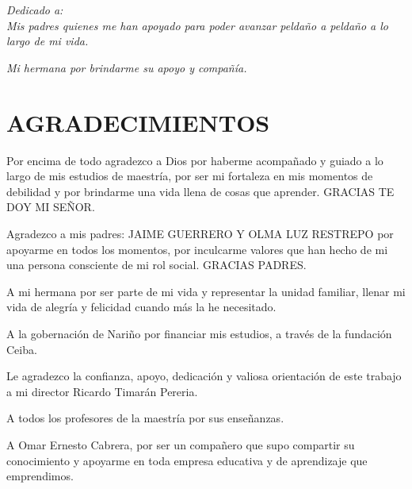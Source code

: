 
\chapter*{}
\begin{flushright}
\textit{Dedicado a: \\
Mis padres quienes me han apoyado  para poder avanzar peldaño a peldaño a lo largo de mi vida.}

\textit{Mi hermana por brindarme su apoyo y compañía.}


\end{flushright}


\chapter*{AGRADECIMIENTOS} %

Por encima de todo agradezco a Dios por haberme acompañado y guiado a lo largo de mis estudios de maestría, por ser mi fortaleza en mis momentos de debilidad y por brindarme una vida llena de cosas que aprender. GRACIAS TE DOY MI SEÑOR.

Agradezco a mis padres: JAIME GUERRERO Y OLMA LUZ RESTREPO por apoyarme en todos los momentos, por inculcarme valores que han hecho de mi una persona consciente de mi rol social. GRACIAS PADRES.

A mi hermana por ser parte de mi vida y representar la unidad familiar, llenar mi vida de alegría y felicidad cuando más la he necesitado.

A la gobernación de Nariño por financiar mis estudios, a través de la fundación Ceiba.

Le agradezco la confianza, apoyo, dedicación y  valiosa orientación de este trabajo   a  mi director Ricardo Timarán Pereria.
  
A todos los profesores de la maestría  por sus enseñanzas.   

A Omar Ernesto Cabrera, por ser un compañero que supo compartir su conocimiento y apoyarme en toda empresa educativa y de aprendizaje que emprendimos.